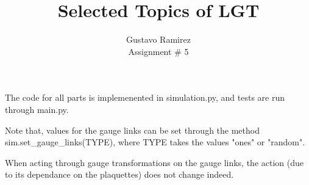 \documentclass[11pt]{article}
\title{\textbf{Selected Topics of LGT}}
\author{Gustavo Ramirez\\
		Assignment \# 5}
\date{}
\begin{document}
\maketitle

The code for all parts is implemenented in simulation.py, and tests are run through main.py.

Note that, values for the gauge links can be set through the method sim.set\_gauge\_links(TYPE), where TYPE takes the values "ones" or "random".

When acting through gauge transformations on the gauge links, the action (due to its dependance on the plaquettes) does not change indeed.
\end{document}
